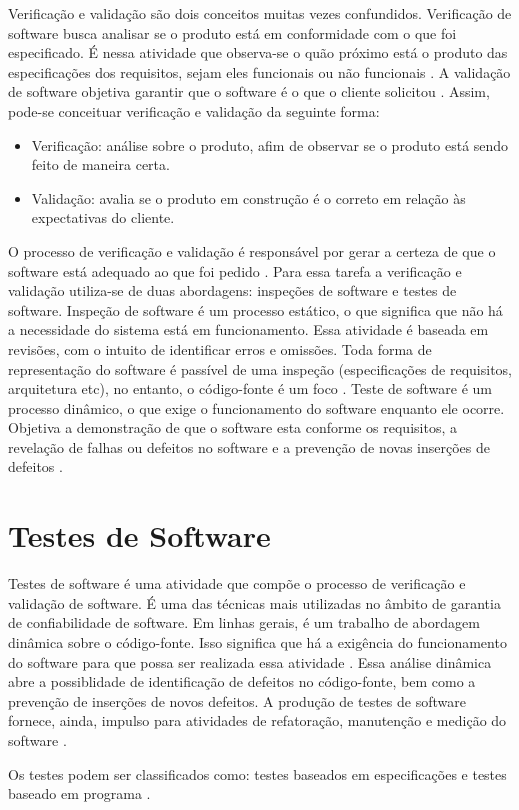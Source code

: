 \par
\indent Verificação e validação são dois conceitos muitas vezes confundidos. Verificação de software busca analisar se o produto está em conformidade com o que foi especificado. É nessa atividade que observa-se o quão próximo está o produto das especificações dos requisitos, sejam eles funcionais ou não funcionais \cite{sommerville_2007}. A validação de software objetiva garantir que o software é o que o cliente solicitou \cite{sommerville_2007}. Assim, pode-se conceituar verificação e validação da seguinte forma:
\begin{itemize}
\item Verificação: análise sobre o produto, afim de observar se o produto está sendo feito de maneira certa.
\item Validação: avalia se o produto em construção é o correto em relação às expectativas do cliente.
\end{itemize}
\par
\indent O processo de verificação e validação é responsável por gerar a certeza de que o software está adequado ao que foi pedido \cite{sommerville_2007}. Para essa tarefa a verificação e validação utiliza-se de duas abordagens: inspeções de software e testes de software. Inspeção de software é um processo estático, o que significa que não há a necessidade do sistema está em funcionamento. Essa atividade é baseada em revisões, com o intuito de identificar erros e omissões. Toda forma de representação do software é passível de uma inspeção (especificações de requisitos, arquitetura etc), no entanto, o código-fonte é um foco \cite{sommerville_2007}. Teste de software é um processo dinâmico, o que exige o funcionamento do software enquanto ele ocorre. Objetiva a demonstração de que o software esta conforme os requisitos, a revelação de falhas ou defeitos no software \cite{sommerville_2007} e a prevenção de novas inserções de defeitos \cite{burke_coyner_2003}.

\section{Testes de Software}
Testes de software é uma atividade que compõe o processo de verificação e validação de software. É uma das técnicas mais utilizadas no âmbito de garantia de confiabilidade de software. Em linhas gerais, é um trabalho de abordagem dinâmica sobre o código-fonte. Isso significa que há a exigência do funcionamento do software para que possa ser realizada essa atividade \cite{barbosa_et_al_2009}. Essa análise dinâmica abre a possiblidade de identificação de defeitos no código-fonte, bem como a prevenção de inserções de novos defeitos. A produção de testes de software fornece, ainda, impulso para atividades de refatoração, manutenção e medição do software \cite{barbosa_et_al_2009}.
\par
\indent Os testes podem ser classificados como: testes baseados em especificações e testes baseado em programa \cite{barbosa_et_al_2009}.

